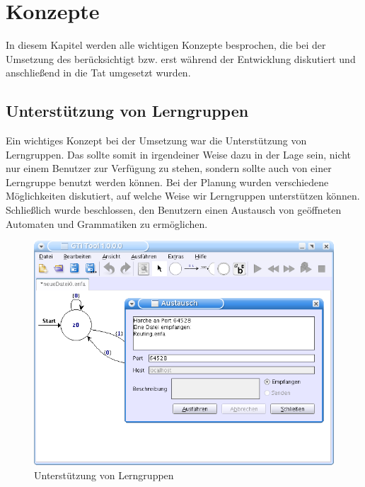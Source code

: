 

\chapter{Konzepte}\label{Concepts}

In diesem Kapitel werden alle wichtigen Konzepte besprochen, die bei der
Umsetzung des \gtitools berücksichtigt bzw. erst während der Entwicklung
diskutiert und anschließend in die Tat umgesetzt wurden.\vspace{10pt}


\section{Unterstützung von Lerngruppen}\label{ConceptsLerning}

Ein wichtiges Konzept bei der Umsetzung war die Unterstützung von Lerngruppen.
Das \gtitool sollte somit in irgendeiner Weise dazu in der Lage sein, nicht nur
einem Benutzer zur Verfügung zu stehen, sondern sollte auch von einer
Lerngruppe benutzt werden können. Bei der Planung wurden verschiedene
Möglichkeiten diskutiert, auf welche Weise wir Lerngruppen unterstützen
können. Schließlich wurde beschlossen, den Benutzern einen Austausch von
geöffneten Automaten und Grammatiken zu ermöglichen.\vspace{10pt}

\begin{figure}[h!]
\begin{center}
\includegraphics[width=12cm]{../images/exchange.png}
\caption{Unterstützung von Lerngruppen}
\end{center}
\end{figure}
\vspace{10pt}


